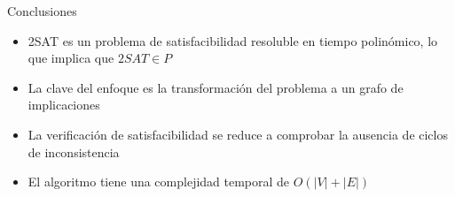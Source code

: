 \documentclass{beamer}
\begin{document}
\begin{frame}{Conclusiones}
\begin{itemize}
\item 2SAT es un problema de satisfacibilidad resoluble en tiempo polinómico, lo que implica que $2SAT \in P$
\item La clave del enfoque es la transformación del problema a un grafo de implicaciones
\item La verificación de satisfacibilidad se reduce a comprobar la ausencia de ciclos de inconsistencia
\item El algoritmo tiene una complejidad temporal de $O(|V| + |E|)$
\end{itemize}

\end{frame}
\end{document}
